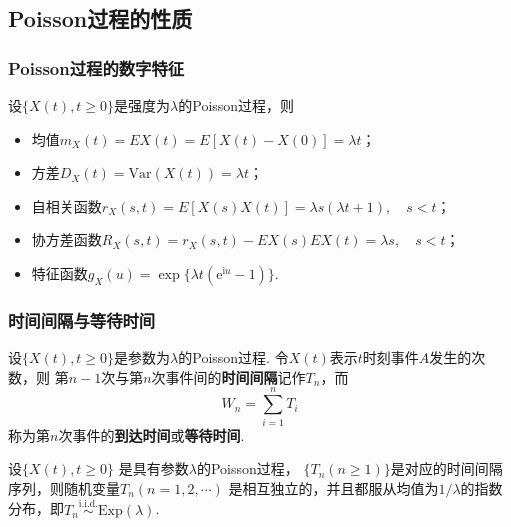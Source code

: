 \subsection{Poisson过程的性质}

\begin{frame}
    \frametitle{Poisson过程的数字特征}
    \begin{myproposition}[Poisson过程的数字特征]
        设$\{X(t),t\geqslant 0\}$是强度为$\lambda$的Poisson过程，则
        \begin{itemize}
            \item 均值$m_X(t)=EX(t)=E[X(t)-X(0)]=\lambda t$；
            \item 方差$D_X(t)=\mathrm{Var}(X(t))=\lambda t$；
            \item 自相关函数$r_X(s,t)=E[X(s)X(t)]=\lambda s(\lambda t+1),\quad s<t$；
            \item 协方差函数$R_X(s,t)=r_X(s,t)-EX(s)EX(t)=\lambda s,\quad s<t$；
            \item 特征函数$g_X(u)=\exp\{\lambda t(\mathrm e^{\mathrm iu}-1)\}$.
        \end{itemize}
    \end{myproposition}
\end{frame}

\begin{frame}
    \frametitle{时间间隔与等待时间}
    \begin{mydefinition}[时间间隔与等待时间]
        设$\{X(t),t\geqslant 0\}$是参数为$\lambda$的Poisson过程.
        令$X(t)$表示$t$时刻事件$A$发生的次数，则
        第$n-1$次与第$n$次事件间的\textbf{时间间隔}记作$T_n$，而
        \begin{equation*}
            W_n=\sum_{i=1}^nT_i
        \end{equation*}
        称为第$n$次事件的\textbf{到达时间}或\textbf{等待时间}. 
    \end{mydefinition}
    \begin{mytheorem}[时间间隔的分布]
        设$\{X(t),t\geqslant 0\}$ 是具有参数$\lambda$的Poisson过程，
        $\{T_n(n\geqslant 1)\}$是对应的时间间隔序列，则随机变量$T_n(n=1,2,\cdots)$
        是相互独立的，并且都服从均值为$1/\lambda$的指数分布，即$T_n\overset{\mathrm{i.i.d.}}{\sim} \mathrm{Exp}(\lambda)$.
    \end{mytheorem}
\end{frame}

